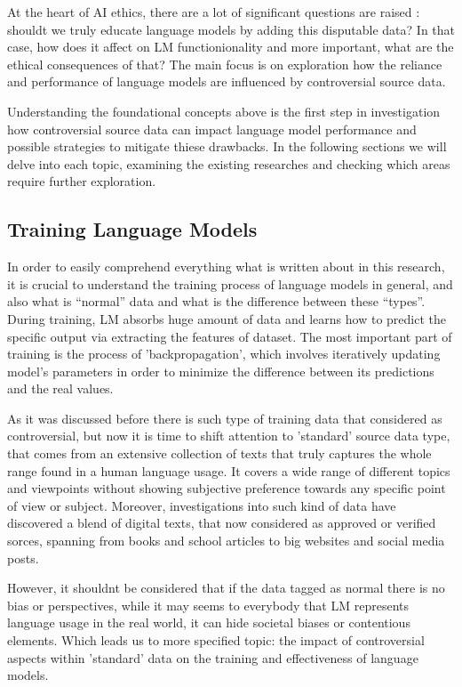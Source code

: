 At the heart of AI ethics, there are a lot of significant questions are raised : shouldt we truly educate language models by adding this disputable data? In that case, how does it affect on LM functionionality and more important, what are the ethical consequences of that? The main focus is on exploration how the reliance and performance of language models are influenced by controversial source data.


Understanding the foundational concepts above is the first step in investigation how controversial source data can impact language model performance and possible strategies to mitigate thiese drawbacks. In the following sections we will delve into each topic, examining the existing researches and checking which areas require further exploration.  

\subsection{Training Language Models} 
In order to easily comprehend everything what is written about in this research, it is crucial to understand the training process of language models in general, and also what is “normal” data and what is the difference between these “types”. During training, LM absorbs huge amount of data and learns how to predict the specific output via extracting the features of dataset. The most important part of training is the process of 'backpropagation', which involves iteratively updating model’s parameters in order to minimize the difference between its predictions and the real values.   \cite{KGK2016}

As it was discussed before there is such type of training data that considered as controversial, but now it is time to shift attention to 'standard' source data type, that comes from an extensive collection of texts that truly captures the whole range found in a human language usage. It covers a wide range of different topics and viewpoints without showing subjective preference towards any specific point of view or subject. Moreover, investigations into such kind of data have discovered a blend of digital texts, that now considered as approved or verified sorces, spanning from books and school articles to big websites and social media posts.   \cite{jd2019}

However, it shouldnt be considered that if the data tagged as normal there is no bias or perspectives, while it may seems to everybody that LM represents language usage in the real world, it can hide societal biases or contentious elements. Which leads us to more specified topic: the impact of controversial aspects within 'standard' data on the training and effectiveness of language models. \cite{TB2016}

